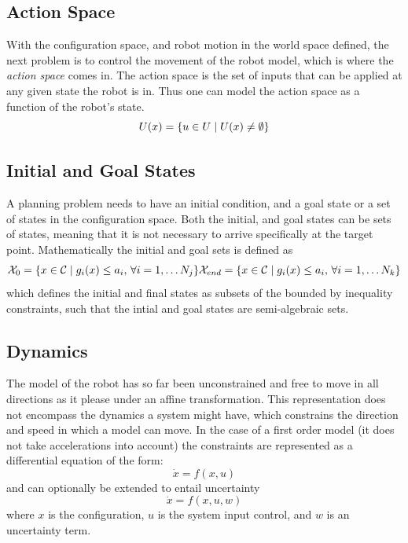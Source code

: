 \subsection{Action Space}

With the configuration space, and robot motion in the world space defined, the
next problem is to control the movement of the robot model, which is where the
\textit{action space} comes in. The action space is the set of inputs that can
be applied at any given state the robot is in. Thus one can model the action
space as a function of the robot's state.
\[
  U(x) = \lbrace u \in U \mid U(x)
    \neq \emptyset \rbrace
\]

\subsection{Initial and Goal States}

A planning problem needs to have an initial condition, and a goal state or a set
of states in the configuration space. Both the initial, and goal states can be
sets of states, meaning that it is not necessary to arrive specifically at the
target point. Mathematically the initial and goal sets is defined as
\[
  \mathcal{X}_0 = \lbrace x \in \mathcal{C}{} \mid g_i(x) \leq a_i,
    \, \forall i = 1,\ldots N_j\rbrace \\
  \mathcal{X}_{end} = \lbrace x \in \mathcal{C}{} \mid g_i(x) \leq
    a_i, \, \forall i = 1,\ldots N_k\rbrace
\]
which defines the initial and final states as subsets of the
\modelconfigurationspace{} bounded by inequality constraints, such that the
intial and goal states are semi-algebraic sets.

\subsection{Dynamics}

The model of the robot has so far been unconstrained and free to move in all
directions as it please under an affine transformation. This representation does
not encompass the dynamics a system might have, which constrains the direction
and speed in which a model can move. In the case of a first order model (\ie it
does not take accelerations into account) the constraints are represented as a
differential equation of the form:
\[
  \dot{x} = f(x,u)
\]
and can optionally be extended to entail uncertainty
\[
  \dot{x} = f(x,u,w)
\]
where \(x\) is the configuration, \(u\) is the system input control, and \(w\)
is an uncertainty term.

